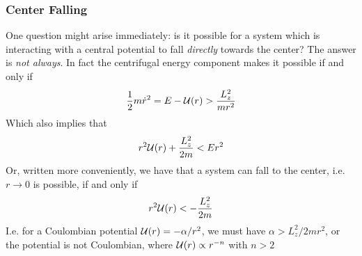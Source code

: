 \documentclass[../admech.tex]{subfiles}
\begin{document}
\subsubsection{Center Falling}
One question might arise immediately: is it possible for a system which is interacting with a central potential to fall \emph{directly} towards the center? The answer is \emph{not always}. In fact the centrifugal energy component makes it possible if and only if
\begin{equation}
	\frac{1}{2}m\dot{r}^2=E-\mathcal{U}(r)>\frac{L_z^2}{mr^2}
	\label{eq:centerfallchar}
\end{equation}
Which also implies that
\begin{equation*}
	r^2\mathcal{U}(r)+\frac{L_z^2}{2m}<Er^2
\end{equation*}
Or, written more conveniently, we have that a system can fall to the center, i.e. $r\to0$ is possible, if and only if
\begin{equation}
	r^2\mathcal{U}(r)<-\frac{L_z^2}{2m}
	\label{eq:centerfallpot}
\end{equation}
I.e. for a Coulombian potential $\mathcal{U}(r)=-\alpha/r^2$, we must have $\alpha>L_z^2/2mr^2$, or the potential is not Coulombian, where $\mathcal{U}(r)\propto r^{-n}$ with $n>2$
\end{document}
